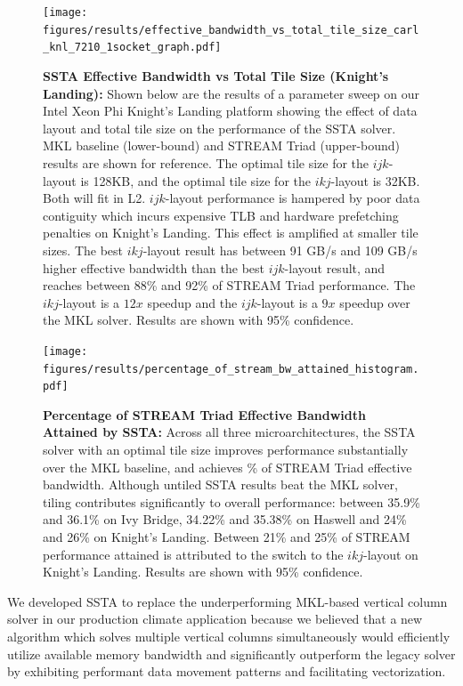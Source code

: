 \documentclass{sig-alternate}
\newcommand{\textapprox}{\texttildelow}
\begin{document}
\begin{figure}[!h]
  \centering
  \caption{
    \textbf{SSTA Effective Bandwidth vs Total Tile Size (Knight's Landing):}
    Shown below are the results of a parameter sweep on our Intel Xeon Phi
      Knight's Landing platform showing the effect of data layout and total
      tile size on the performance of the SSTA solver.
    MKL baseline (lower-bound) and STREAM Triad (upper-bound) results are shown
      for reference.
    The optimal tile size for the \(ijk\)-layout is 128KB, and the optimal
      tile size for the \(ikj\)-layout is 32KB.
    Both will fit in L2.
    \(ijk\)-layout performance is hampered by poor data contiguity which incurs
      expensive TLB and hardware prefetching penalties on Knight's Landing.
    This effect is amplified at smaller tile sizes.
    The best \(ikj\)-layout result has between 91 GB/s and 109 GB/s higher
      effective bandwidth than the best \(ijk\)-layout result, and reaches
      between 88\% and 92\% of STREAM Triad performance.
    The \(ikj\)-layout is a \(12x\) speedup and the \(ijk\)-layout is a
      \(9x\) speedup over the MKL solver.
    Results are shown with 95\% confidence.
  }
  \label{fig:results:bw_vs_tile_size_knl}
  \texttt{[image: figures/results/effective\_bandwidth\_vs\_total\_tile\_size\_carl\_knl\_7210\_1socket\_graph.pdf]}
\end{figure}

\begin{figure}[!h]
  \centering
  \caption{
    \textbf{Percentage of STREAM Triad Effective Bandwidth Attained by SSTA:}
    Across all three microarchitectures, the SSTA solver with an optimal tile
      size improves performance substantially over the MKL baseline, and
      achieves \textapprox 90\% of STREAM Triad effective bandwidth.
    Although untiled SSTA results beat the MKL solver, tiling contributes
      significantly to overall performance: between 35.9\% and 36.1\% on 
      Ivy Bridge, 34.22\% and 35.38\% on Haswell and 24\% and 26\% on 
      Knight's Landing.
    Between 21\% and 25\% of STREAM performance attained is attributed to the
      switch to the \(ikj\)-layout on Knight's Landing. 
    Results are shown with 95\% confidence.
  }
  \label{fig:results:percent_stream_bw}
  \texttt{[image: figures/results/percentage\_of\_stream\_bw\_attained\_histogram.pdf]}
\end{figure}

We developed SSTA to replace the underperforming MKL-based vertical column
  solver in our production climate application because we believed that a new
  algorithm which solves multiple vertical columns simultaneously would
  efficiently utilize available memory bandwidth and significantly outperform the
  legacy solver by exhibiting performant data movement patterns and facilitating
  vectorization.
\end{document}
